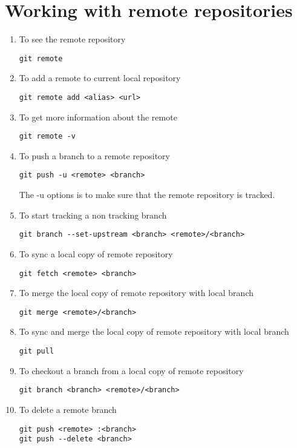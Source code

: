 \documentclass[paper=a4, fontsize=12pt]{scrartcl}
\begin{document}
\section*{Working with remote repositories}
\begin{enumerate}
\item To see the remote repository
\begin{lstlisting}
git remote
\end{lstlisting}
\item To add a remote to current local repository
\begin{lstlisting}
git remote add <alias> <url>
\end{lstlisting}
\item To get more information about the remote
\begin{lstlisting}
git remote -v
\end{lstlisting}
\item To push a branch to a remote repository
\begin{lstlisting}
git push -u <remote> <branch>
\end{lstlisting}
The -u options is to make sure that the remote repository is tracked.
\item To start tracking a non tracking branch
\begin{lstlisting}
git branch --set-upstream <branch> <remote>/<branch>
\end{lstlisting}
\item To sync a local copy of remote repository
\begin{lstlisting}
git fetch <remote> <branch>
\end{lstlisting}
\item To merge the local copy of remote repository with local branch
\begin{lstlisting}
git merge <remote>/<branch>
\end{lstlisting}
\item To sync and merge the local copy of remote repository with local branch
\begin{lstlisting}
git pull
\end{lstlisting}
\item To checkout a branch from a local copy of remote repository
\begin{lstlisting}
git branch <branch> <remote>/<branch>
\end{lstlisting}
\item To delete a remote branch
\begin{lstlisting}
git push <remote> :<branch>
git push --delete <branch>
\end{lstlisting}


\end{enumerate}
\end{document}
